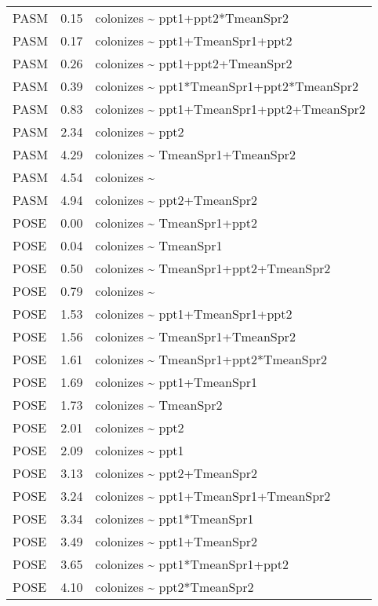 \documentclass[10pt]{article}
\begin{document}
\begin{table}[ht]
\begin{tabularx}{\textwidth}{llZ}
  PASM & 0.15 & colonizes \~{} ppt1+ppt2*TmeanSpr2 \\ 
  PASM & 0.17 & colonizes \~{} ppt1+TmeanSpr1+ppt2 \\ 
  PASM & 0.26 & colonizes \~{} ppt1+ppt2+TmeanSpr2 \\ 
  PASM & 0.39 & colonizes \~{} ppt1*TmeanSpr1+ppt2*TmeanSpr2 \\ 
  PASM & 0.83 & colonizes \~{} ppt1+TmeanSpr1+ppt2+TmeanSpr2 \\ 
  PASM & 2.34 & colonizes \~{} ppt2 \\ 
  PASM & 4.29 & colonizes \~{} TmeanSpr1+TmeanSpr2 \\ 
  PASM & 4.54 & colonizes \~{}  \\ 
  PASM & 4.94 & colonizes \~{} ppt2+TmeanSpr2 \\ 
  POSE & 0.00 & colonizes \~{} TmeanSpr1+ppt2 \\ 
  POSE & 0.04 & colonizes \~{} TmeanSpr1 \\ 
  POSE & 0.50 & colonizes \~{} TmeanSpr1+ppt2+TmeanSpr2 \\ 
  POSE & 0.79 & colonizes \~{}  \\ 
  POSE & 1.53 & colonizes \~{} ppt1+TmeanSpr1+ppt2 \\ 
  POSE & 1.56 & colonizes \~{} TmeanSpr1+TmeanSpr2 \\ 
  POSE & 1.61 & colonizes \~{} TmeanSpr1+ppt2*TmeanSpr2 \\ 
  POSE & 1.69 & colonizes \~{} ppt1+TmeanSpr1 \\ 
  POSE & 1.73 & colonizes \~{} TmeanSpr2 \\ 
  POSE & 2.01 & colonizes \~{} ppt2 \\ 
  POSE & 2.09 & colonizes \~{} ppt1 \\ 
  POSE & 3.13 & colonizes \~{} ppt2+TmeanSpr2 \\ 
  POSE & 3.24 & colonizes \~{} ppt1+TmeanSpr1+TmeanSpr2 \\ 
  POSE & 3.34 & colonizes \~{} ppt1*TmeanSpr1 \\ 
  POSE & 3.49 & colonizes \~{} ppt1+TmeanSpr2 \\ 
  POSE & 3.65 & colonizes \~{} ppt1*TmeanSpr1+ppt2 \\ 
  POSE & 4.10 & colonizes \~{} ppt2*TmeanSpr2 \\ 
   \hline
\end{tabularx}
\end{table}
\end{document}
